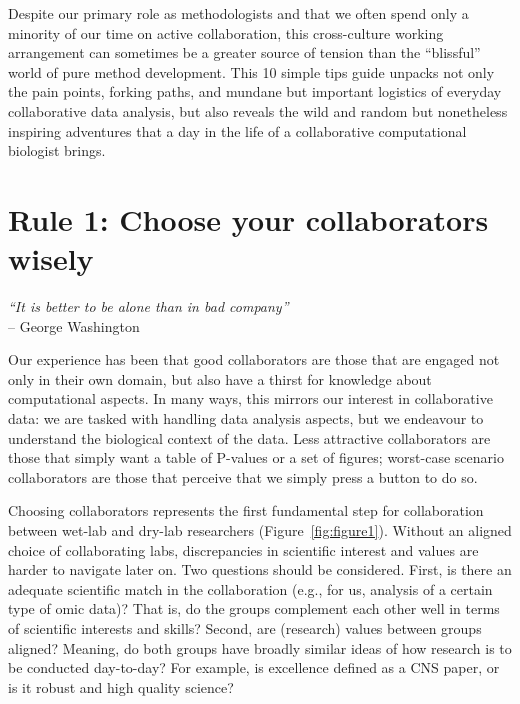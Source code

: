 \documentclass{article}
\begin{document}
Despite our primary role as methodologists and that we often spend only a minority of our time on active collaboration, this cross-culture working arrangement can sometimes be a greater source of tension than the ``blissful'' world of pure method development. This 10 simple tips guide unpacks not only the pain points, forking paths, and mundane but important logistics of everyday collaborative data analysis, but also reveals the wild and random but nonetheless inspiring adventures that a day in the life of a collaborative computational biologist brings.

\section*{Rule 1: Choose your collaborators wisely} %
\label{rule1_choose}

\begin{flushright}
\rightskip=1cm\textit{``It is better to be alone than in bad company''} \\
\vspace{.2em}
\rightskip=0cm -- George Washington
\end{flushright}

Our experience has been that good collaborators are those that are engaged not only in their own domain, but also have a thirst for knowledge about computational aspects. In many ways, this mirrors our interest in collaborative data: we are tasked with handling data analysis aspects, but we endeavour to understand the biological context of the data. Less attractive collaborators are those that simply want a table of P-values or a set of figures; worst-case scenario collaborators are those that perceive that we simply press a button to do so. 

Choosing collaborators represents the first fundamental step for collaboration between wet-lab and dry-lab researchers (Figure~\ref{fig:figure1}). Without an aligned choice of collaborating labs, discrepancies in scientific interest and values are harder to navigate later on. Two questions should be considered. First, is there an adequate scientific match in the collaboration (e.g., for us, analysis of a certain type of omic data)? That is, do the groups complement each other well in terms of scientific interests and skills? Second, are (research) values between groups aligned? Meaning, do both groups have broadly similar ideas of how research is to be conducted day-to-day? For example, is excellence defined as a CNS paper, or is it robust and high quality science?
\end{document}
